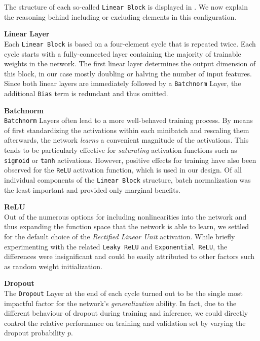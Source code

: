 The structure of each so-called \texttt{Linear Block} is displayed in .
We now explain the reasoning behind including or excluding elements in this configuration.

\textbf{Linear Layer} \\
Each \texttt{Linear Block} is based on a four-element cycle that is repeated twice.
Each cycle starts with a fully-connected layer containing the majority of trainable weights in the network.
The first linear layer determines the output dimension of this block, in our case mostly doubling or halving the number of input features.
Since both linear layers are immediately followed by a \texttt{Batchnorm} Layer, the additional \texttt{Bias} term is redundant and thus omitted.

\textbf{Batchnorm} \\
\texttt{Batchnorm} Layers \citep{ioffe2015} often lead to a more well-behaved training process.
By means of first standardizing the activations within each minibatch and rescaling them afterwards, the network \emph{learns} a convenient magnitude of the activations.
This tends to be particularly effective for \emph{saturating} activation functions such as \texttt{sigmoid} or \texttt{tanh} activations. However, positive effects for training have also been observed for the \texttt{ReLU} activation function, which is used in our design.
Of all individual components of the \texttt{Linear Block} structure, batch normalization was the least important and provided only marginal benefits.

\textbf{ReLU} \\
Out of the numerous options for including nonlinearities into the network and thus expanding the function space that the network is able to learn, we settled for the default choice of the \emph{Rectified Linear Unit} activation.
While briefly experimenting with the related \texttt{Leaky ReLU} and \texttt{Exponential ReLU}, the differences were insignificant and could be easily attributed to other factors such as random weight initialization.

\textbf{Dropout} \label{dropout} \\
The \texttt{Dropout} Layer \citep{srivastava2014} at the end of each cycle turned out to be the single most impactful factor for the network's \emph{generalization} ability.
In fact, due to the different behaviour of dropout during training and inference, we could directly control the relative performance on training and validation set by varying the dropout probability $p$.

